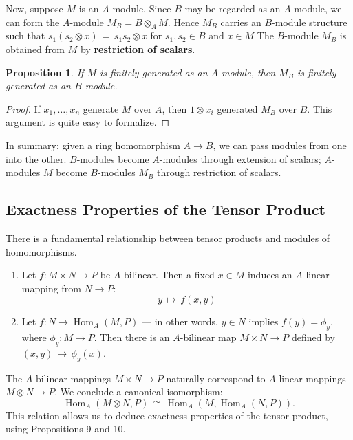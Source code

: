 \documentclass[11pt]{article}
\newtheorem{proposition}{Proposition}
\newcommand{\Hom}{\operatorname{Hom}}
\begin{document}
Now, suppose $M$ is an $A$-module. Since $B$ may be regarded as an $A$-module, we can form the $A$-module $M_{B} = B \otimes_{A} M$. Hence $M_{B}$ carries an $B$-module structure such that $s_{1} (s_{2} \otimes x) \, = \, s_{1}s_{2} \otimes x$ for $s_{1}, s_{2} \in B$ and $x \in M$ The $B$-module $M_{B}$ is obtained from $M$ by \textbf{restriction of scalars}.

\begin{adjustwidth}{0.5cm}{}
  \begin{proposition}
    If $M$ is finitely-generated as an $A$-module, then $M_{B}$ is finitely-generated as an $B$-module.
  \end{proposition}
  \begin{proof}
    If $x_{1}, \ldots, x_{n}$ generate $M$ over $A$, then $1 \otimes x_{i}$ generated $M_{B}$ over $B$. This argument is quite easy to formalize.
  \end{proof}
\end{adjustwidth}

In summary: given a ring homomorphism $A \to B$, we can pass modules from one into the other. $B$-modules become $A$-modules through extension of scalars; $A$-modules $M$ become $B$-modules $M_{B}$ through restriction of scalars.


\subsection{Exactness Properties of the Tensor Product}

There is a fundamental relationship between tensor products and modules of homomorphisms. 
\begin{enumerate}
  \item Let $f : M \times N \to P$ be $A$-bilinear. Then a fixed $x \in M$ induces an $A$-linear mapping from $N \to P$:
  \[
    y \, \mapsto \, f(x, y)
  \]
  \item Let $f : N \to \Hom_{A}(M, P)$ --- in other words, $y \in N$ implies $f(y) = \phi_{y}$, where $\phi_{y} : M \to P$. Then there is an $A$-bilinear map $M \times N \to P$ defined by $(x, y) \, \mapsto \, \phi_{y}(x)$.
\end{enumerate}
The $A$-bilinear mappings $M \times N \to P$ naturally correspond to $A$-linear mappings $M \otimes N \to P$. We conclude a canonical isomorphism:
\[
  \Hom_{A}(M \otimes N, P) \, \cong \, \Hom_{A}(M, \Hom_{A}(N, P)).
\]
This relation allows us to deduce exactness properties of the tensor product, using Propositions 9 and 10.
\end{document}
